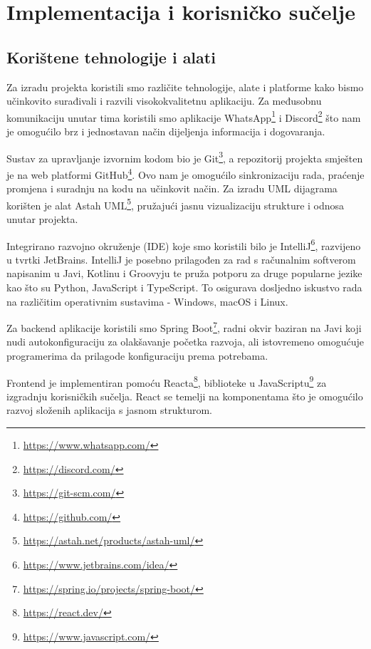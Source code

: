 \chapter{Implementacija i korisničko sučelje}
		
		\section{Korištene tehnologije i alati}
		
			 
			 Za izradu projekta koristili smo različite tehnologije, alate i platforme kako bismo učinkovito surađivali i razvili visokokvalitetnu aplikaciju. Za međusobnu komunikaciju unutar tima koristili smo aplikacije WhatsApp\footnote{\url{https://www.whatsapp.com/}} i Discord\footnote{\url{https://discord.com/}} što nam je omogućilo brz i jednostavan način dijeljenja informacija i dogovaranja.
			 
			 Sustav za upravljanje izvornim kodom bio je Git\footnote{\url{https://git-scm.com/}}, a repozitorij projekta smješten je na web platformi GitHub\footnote{\url{https://github.com/}}. Ovo nam je omogućilo sinkronizaciju rada, praćenje promjena i suradnju na kodu na učinkovit način. Za izradu UML dijagrama korišten je alat Astah UML\footnote{\url{https://astah.net/products/astah-uml/}}, pružajući jasnu vizualizaciju strukture i odnosa unutar projekta.
			 
			 Integrirano razvojno okruženje (IDE) koje smo koristili bilo je IntelliJ\footnote{\url{https://www.jetbrains.com/idea/}}, razvijeno u tvrtki JetBrains. IntelliJ je posebno prilagođen za rad s računalnim softverom napisanim u Javi, Kotlinu i Groovyju te pruža potporu za druge popularne jezike kao što su Python, JavaScript i TypeScript. To osigurava dosljedno iskustvo rada na različitim operativnim sustavima - Windows, macOS i Linux.
			 
			 Za backend aplikacije koristili smo Spring Boot\footnote{\url{https://spring.io/projects/spring-boot/}}, radni okvir baziran na Javi koji nudi autokonfiguraciju za olakšavanje početka razvoja, ali istovremeno omogućuje programerima da prilagode konfiguraciju prema potrebama.
			 
			 Frontend je implementiran pomoću Reacta\footnote{\url{https://react.dev/}}, biblioteke u JavaScriptu\footnote{\url{https://www.javascript.com/}} za izgradnju korisničkih sučelja. React se temelji na komponentama što je omogućilo razvoj složenih aplikacija s jasnom strukturom.\\
			 
